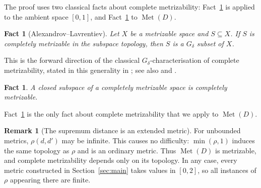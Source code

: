 \documentclass[12pt]{article}
\newtheorem{fact}[theorem]{Fact}
\theoremstyle{definition}
\newtheorem{remark}[theorem]{Remark}
\newcommand{\Met}{\operatorname{Met}}
\newcommand{\Gdelta}{G_{\!\delta}}
\begin{document}
The proof uses two classical facts about complete metrizability:
Fact~\ref{thm:background-gdelta} is applied to the ambient space
$[0,1]$, and Fact~\ref{thm:background-closed} to $\Met(D)$.

\begin{fact}[Alexandrov--Lavrentiev]
  \label{thm:background-gdelta}
  Let $X$ be a metrizable space and $S \subseteq X$. If $S$ is
  completely metrizable in the subspace topology, then $S$ is a $\Gdelta$
  subset of $X$.
\end{fact}
This is the forward direction of the classical $\Gdelta$-characterisation
of complete metrizability, stated in this generality in
\cite[Theorem~3.11]{Kechris1995}; see also
\cite[Theorems~4.3.23--4.3.24]{Engelking1989} and
\cite[Theorem~24.12]{Willard2004}.

\begin{fact}
  \label{thm:background-closed}
  A closed subspace of a completely metrizable space is completely metrizable.
\end{fact}
Fact~\ref{thm:background-closed} is the only fact about complete
metrizability that we apply to $\Met(D)$.

\begin{remark}[The supremum distance is an extended metric]
  \label{rem:extended-rho}
  For unbounded metrics, $\rho(d,d')$ may be infinite. This causes no
  difficulty: $\min(\rho,1)$ induces the same topology as $\rho$ and is an
  ordinary metric. Thus $\Met(D)$ is metrizable, and complete metrizability
  depends only on its topology. In any case, every metric constructed in
  Section~\ref{sec:main} takes values in $[0,2]$, so all instances of
  $\rho$ appearing there are finite.
\end{remark}
\end{document}
